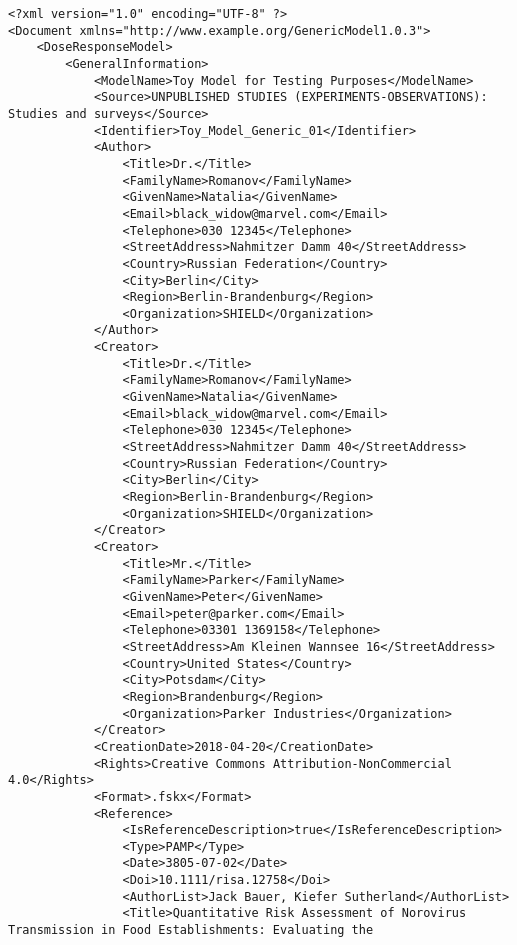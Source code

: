 \begin{lstlisting}[language=RAKIP, caption={Example of DoseResponseModel}]
<?xml version="1.0" encoding="UTF-8" ?>
<Document xmlns="http://www.example.org/GenericModel1.0.3">
    <DoseResponseModel>
        <GeneralInformation>
            <ModelName>Toy Model for Testing Purposes</ModelName>
            <Source>UNPUBLISHED STUDIES (EXPERIMENTS-OBSERVATIONS): Studies and surveys</Source>
            <Identifier>Toy_Model_Generic_01</Identifier>
            <Author>
                <Title>Dr.</Title>
                <FamilyName>Romanov</FamilyName>
                <GivenName>Natalia</GivenName>
                <Email>black_widow@marvel.com</Email>
                <Telephone>030 12345</Telephone>
                <StreetAddress>Nahmitzer Damm 40</StreetAddress>
                <Country>Russian Federation</Country>
                <City>Berlin</City>
                <Region>Berlin-Brandenburg</Region>
                <Organization>SHIELD</Organization>
            </Author>
            <Creator>
                <Title>Dr.</Title>
                <FamilyName>Romanov</FamilyName>
                <GivenName>Natalia</GivenName>
                <Email>black_widow@marvel.com</Email>
                <Telephone>030 12345</Telephone>
                <StreetAddress>Nahmitzer Damm 40</StreetAddress>
                <Country>Russian Federation</Country>
                <City>Berlin</City>
                <Region>Berlin-Brandenburg</Region>
                <Organization>SHIELD</Organization>
            </Creator>
            <Creator>
                <Title>Mr.</Title>
                <FamilyName>Parker</FamilyName>
                <GivenName>Peter</GivenName>
                <Email>peter@parker.com</Email>
                <Telephone>03301 1369158</Telephone>
                <StreetAddress>Am Kleinen Wannsee 16</StreetAddress>
                <Country>United States</Country>
                <City>Potsdam</City>
                <Region>Brandenburg</Region>
                <Organization>Parker Industries</Organization>
            </Creator>
            <CreationDate>2018-04-20</CreationDate>
            <Rights>Creative Commons Attribution-NonCommercial 4.0</Rights>
            <Format>.fskx</Format>
            <Reference>
                <IsReferenceDescription>true</IsReferenceDescription>
                <Type>PAMP</Type>
                <Date>3805-07-02</Date>
                <Doi>10.1111/risa.12758</Doi>
                <AuthorList>Jack Bauer, Kiefer Sutherland</AuthorList>
                <Title>Quantitative Risk Assessment of Norovirus Transmission in Food Establishments: Evaluating the

\end{lstlisting}
